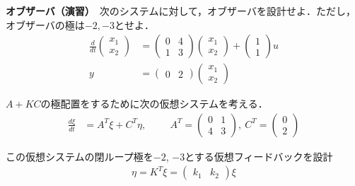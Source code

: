 \documentclass[a4paper,11pt,fleqn]{jreport}
\begin{document}
\newpage
\noindent
{\bf オブザーバ（演習）}　次のシステムに対して，オブザーバを設計せよ．ただし，オブザーバの極は$-2,-3$とせよ．
\begin{align*}
	\frac{d}{dt}
	\left (
	\begin{array}{c}
	 x_1 \\ x_2 
	\end{array}
	\right )
	& = 
	\left (
	\begin{array}{cc}
	 0 & 4 \\
	 1 & 3
	\end{array}
	\right )
	\left (
	\begin{array}{c}
	 x_1 \\ x_2 
	\end{array}
	\right )
	+
	\left (
	\begin{array}{c}
	 1 \\ 1 
	\end{array}
	\right )
	u
\\
	y&=
	\left ( \begin{array}{cc}
		0 & 2 
	\end{array} \right )
	\left (	\begin{array}{c}
		x_1 \\ x_2 
	\end{array} \right )
\end{align*}

$A+KC$の極配置をするために次の仮想システムを考える．
\begin{align*}
 \frac{d \xi}{dt} & = A^T \xi + C^T \eta, 
\hspace{1cm}
	A^T =
	\left (
	\begin{array}{cc}
	 0 & 1 \\
	 4 & 3
	\end{array}
	\right )
	, \ 
	C^T = 
	\left (
	\begin{array}{c}
	 0 \\ 2 
	\end{array}
	\right )
\end{align*}

この仮想システムの閉ループ極を$-2$, $-3$とする仮想フィードバックを設計
\begin{align*}
 \eta =  K^T \xi
	=
	\left ( \begin{array}{cc}
		k_1 & k_2 
	\end{array} \right )
	\xi
\end{align*}
\end{document}
